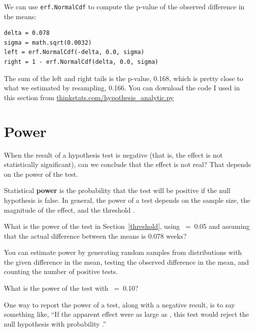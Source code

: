 \documentclass[12pt]{book}
\begin{document}
We can use {\tt erf.NormalCdf} to compute the p-value of the observed 
difference in the means:
%
\begin{verbatim}
delta = 0.078
sigma = math.sqrt(0.0032)
left = erf.NormalCdf(-delta, 0.0, sigma)
right = 1 - erf.NormalCdf(delta, 0.0, sigma)
\end{verbatim}

The sum of the left and right tails is the p-value, 0.168, which is
pretty close to what we estimated by resampling, 0.166. 
You can download the code I used in this section from
\url{thinkstats.com/hypothesis_analytic.py}


\section{Power}

When the result of a hypothesis test is negative (that is, the effect is
not statistically significant), can we conclude that the effect is not
real?  That depends on the power of the test.

Statistical {\bf power} is the probability that the test will be
positive if the null hypothesis is false.  In general, the power of a
test depends on the sample size, the magnitude of the effect, and the
threshold \myalpha.

\begin{exercise}
What is the power of the test in Section~\ref{threshold}, using
\myalpha~=~0.05 and assuming that the actual difference between the
means is 0.078 weeks?

You can estimate power by generating random samples from distributions
with the given difference in the mean, testing the observed difference
in the mean, and counting the number of positive tests.

What is the power of the test with \myalpha~=~0.10?

\end{exercise}

One way to report the power of a test, along with a negative result,
is to say something like, ``If the apparent effect were as large
as \x, this test would reject the null hypothesis with probability \p.''



\end{document}
